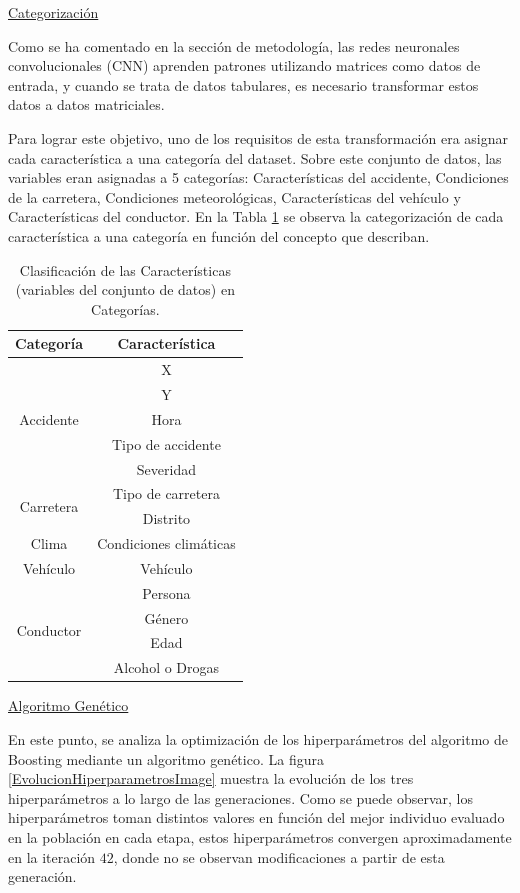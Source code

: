 \documentclass{uathesis-es}
\begin{document}
\underline{Categorización}

Como se ha comentado en la sección de metodología, las redes neuronales convolucionales (CNN) aprenden patrones utilizando matrices como datos de entrada, y cuando se trata de datos tabulares, es necesario transformar estos datos a datos matriciales.

Para lograr este objetivo, uno de los requisitos de esta transformación era asignar cada característica a una categoría del dataset. Sobre este conjunto de datos, las variables eran asignadas a 5 categorías: Características del accidente, Condiciones de la carretera, Condiciones meteorológicas, Características del vehículo y Características del conductor. En la Tabla \ref{JC} se observa la categorización de cada característica a una categoría en función del concepto que describan.

\begin{table}[H]
	\centering

		\begin{tabular}{ |c|c| }
			\hline
			\textbf{Categoría} & \textbf{Característica} \\
			\hline
			\hline
			\multirow{5}{*}{Accidente} & X \\
									   & Y \\
									   & Hora \\
									   & Tipo de accidente \\
									   & Severidad \\
			\hline
			\hline
			\multirow{2}{*}{Carretera} & Tipo de carretera \\
									   & Distrito \\
			\hline
			\hline
			Clima & Condiciones climáticas \\
			\hline
			\hline
			Vehículo & Vehículo \\
			\hline
			\hline
			\multirow{4}{*}{Conductor} & Persona \\
									   & Género \\
									   & Edad \\
									   & Alcohol o Drogas \\
			\hline
			\hline
		\end{tabular}

	\caption{Clasificación de las Características (variables del conjunto de datos) en Categorías.}
	\label{JC}
\end{table}


\underline{Algoritmo Genético}

En este punto, se analiza la optimización de los hiperparámetros del algoritmo de Boosting mediante un algoritmo genético. La figura \ref{EvolucionHiperparametrosImage} muestra la evolución de  los tres hiperparámetros a lo largo de las generaciones. Como se puede observar, los hiperparámetros toman distintos valores en función del mejor individuo evaluado en la población en cada etapa, estos hiperparámetros convergen aproximadamente en la iteración $42$, donde no se observan modificaciones a partir de esta generación.
\end{document}
